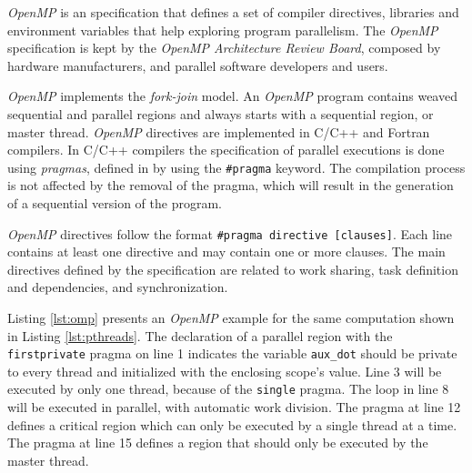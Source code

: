 \textit{OpenMP} is an specification that defines a set of compiler directives,
libraries and environment variables that help exploring program parallelism.
The \textit{OpenMP} specification is kept by the \textit{OpenMP Architecture
Review Board}, composed by hardware manufacturers, and parallel software
developers and users.

\textit{OpenMP} implements the \textit{fork-join} model. An \textit{OpenMP}
program contains weaved sequential and parallel regions and always starts with
a sequential region, or master thread.  \textit{OpenMP} directives are
implemented in C/C++ and Fortran compilers. In C/C++ compilers the
specification of parallel executions is done using \textit{pragmas}, defined in
by using the \texttt{\#pragma} keyword.
The compilation process is not affected by the removal of the pragma,
which will result in the generation of a sequential version of the program.

\textit{OpenMP} directives follow the format \texttt{\#pragma directive
[clauses]}.  Each line contains at least one directive and may contain one or
more clauses. The main directives defined by the specification are related
to work sharing, task definition and dependencies, and synchronization.

Listing \ref{lst:omp} presents an \textit{OpenMP} example for the
same computation shown in Listing \ref{lst:pthreads}. The
declaration of a parallel region with the \texttt{firstprivate} pragma on line
1 indicates the variable \texttt{aux\_dot} should be private to every thread
and initialized with the enclosing scope's value.  Line 3 will be executed by
only one thread, because of the \texttt{single} pragma.
The loop in line 8 will be executed in parallel, with automatic work
division.  The pragma at line 12 defines a critical region which can only be
executed by a single thread at a time. The pragma at line 15 defines a
region that should only be executed by the master thread.

